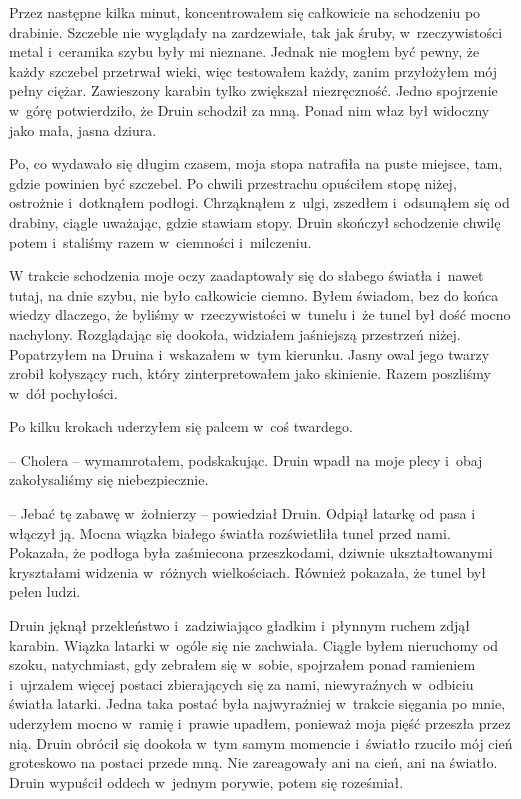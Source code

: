 \documentclass[oneside,polish,11pt,sfheadings]{mwbk}
\begin{document}
Przez następne kilka minut, koncentrowałem się całkowicie na schodzeniu
po drabinie. Szczeble nie wyglądały na zardzewiałe, tak jak śruby, w~rzeczywistości metal i~ceramika szybu były mi nieznane. Jednak nie
mogłem być pewny, że każdy szczebel przetrwał wieki, więc testowałem
każdy, zanim przyłożyłem mój pełny ciężar. Zawieszony karabin tylko
zwiększał niezręczność. Jedno spojrzenie w~górę potwierdziło, że Druin
schodził za mną. Ponad nim właz był widoczny jako mała, jasna dziura.

Po, co wydawało się długim czasem, moja stopa natrafiła na puste
miejsce, tam, gdzie powinien być szczebel. Po chwili przestrachu
opuściłem stopę niżej, ostrożnie i~dotknąłem podłogi. Chrząknąłem z~ulgi, zszedłem i~odsunąłem się od drabiny, ciągle uważając, gdzie
stawiam stopy. Druin skończył schodzenie chwilę potem i~staliśmy razem w~ciemności i~milczeniu.

W trakcie schodzenia moje oczy zaadaptowały się do słabego światła i~nawet tutaj, na dnie szybu, nie było całkowicie ciemno. Byłem świadom,
bez do końca wiedzy dlaczego, że byliśmy w~rzeczywistości w~tunelu i~że
tunel był dość mocno nachylony. Rozglądając się dookoła, widziałem
jaśniejszą przestrzeń niżej. Popatrzyłem na Druina i~wskazałem w~tym
kierunku. Jasny owal jego twarzy zrobił kołyszący ruch, który
zinterpretowałem jako skinienie. Razem poszliśmy w~dół pochyłości.

Po kilku krokach uderzyłem się palcem w~coś twardego. 

-- Cholera -- wymamrotałem, podskakując. Druin wpadł na moje plecy i~obaj
zakołysaliśmy się niebezpiecznie.

-- Jebać tę zabawę w~żołnierzy -- powiedział Druin. Odpiął latarkę od pasa
i włączył ją. Mocna wiązka białego światła rozświetliła tunel przed
nami. Pokazała, że podłoga była zaśmiecona przeszkodami, dziwnie
ukształtowanymi kryształami widzenia w~różnych wielkościach. Również
pokazała, że tunel był pełen ludzi.

Druin jęknął przekleństwo i~zadziwiająco gładkim i~płynnym ruchem zdjął
karabin. Wiązka latarki w~ogóle się nie zachwiała. Ciągle byłem nieruchomy
od szoku, natychmiast, gdy zebrałem się w~sobie, spojrzałem ponad
ramieniem i~ujrzałem więcej postaci zbierających się za nami,
niewyraźnych w~odbiciu światła latarki. Jedna taka postać była
najwyraźniej w~trakcie sięgania po mnie, uderzyłem mocno w~ramię i~prawie upadłem, ponieważ moja pięść przeszła przez nią. Druin obrócił
się dookoła w~tym samym momencie i~światło rzuciło mój cień groteskowo
na postaci przede mną. Nie zareagowały ani na cień, ani na światło.
Druin wypuścił oddech w~jednym porywie, potem się roześmiał.
\end{document}
